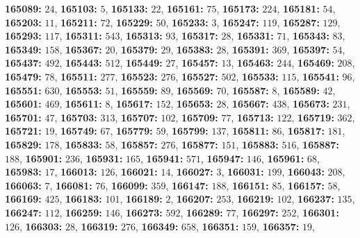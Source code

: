 \textsf{\bfseries 165089:} $24$, \textsf{\bfseries 165103:} $5$, \textsf{\bfseries 165133:} $22$, \textsf{\bfseries 165161:} $75$, \textsf{\bfseries 165173:} $224$, \textsf{\bfseries 165181:} $54$, \textsf{\bfseries 165203:} $11$, \textsf{\bfseries 165211:} $72$, \textsf{\bfseries 165229:} $50$, \textsf{\bfseries 165233:} $3$, \textsf{\bfseries 165247:} $119$, \textsf{\bfseries 165287:} $129$, \textsf{\bfseries 165293:} $117$, \textsf{\bfseries 165311:} $543$, \textsf{\bfseries 165313:} $93$, \textsf{\bfseries 165317:} $28$, \textsf{\bfseries 165331:} $71$, \textsf{\bfseries 165343:} $83$, \textsf{\bfseries 165349:} $158$, \textsf{\bfseries 165367:} $20$, \textsf{\bfseries 165379:} $29$, \textsf{\bfseries 165383:} $28$, \textsf{\bfseries 165391:} $369$, \textsf{\bfseries 165397:} $54$, \textsf{\bfseries 165437:} $492$, \textsf{\bfseries 165443:} $512$, \textsf{\bfseries 165449:} $27$, \textsf{\bfseries 165457:} $13$, \textsf{\bfseries 165463:} $244$, \textsf{\bfseries 165469:} $208$, \textsf{\bfseries 165479:} $78$, \textsf{\bfseries 165511:} $277$, \textsf{\bfseries 165523:} $276$, \textsf{\bfseries 165527:} $502$, \textsf{\bfseries 165533:} $115$, \textsf{\bfseries 165541:} $96$, \textsf{\bfseries 165551:} $630$, \textsf{\bfseries 165553:} $51$, \textsf{\bfseries 165559:} $89$, \textsf{\bfseries 165569:} $70$, \textsf{\bfseries 165587:} $8$, \textsf{\bfseries 165589:} $42$, \textsf{\bfseries 165601:} $469$, \textsf{\bfseries 165611:} $8$, \textsf{\bfseries 165617:} $152$, \textsf{\bfseries 165653:} $28$, \textsf{\bfseries 165667:} $438$, \textsf{\bfseries 165673:} $231$, \textsf{\bfseries 165701:} $47$, \textsf{\bfseries 165703:} $313$, \textsf{\bfseries 165707:} $102$, \textsf{\bfseries 165709:} $77$, \textsf{\bfseries 165713:} $122$, \textsf{\bfseries 165719:} $362$, \textsf{\bfseries 165721:} $19$, \textsf{\bfseries 165749:} $67$, \textsf{\bfseries 165779:} $59$, \textsf{\bfseries 165799:} $137$, \textsf{\bfseries 165811:} $86$, \textsf{\bfseries 165817:} $181$, \textsf{\bfseries 165829:} $178$, \textsf{\bfseries 165833:} $58$, \textsf{\bfseries 165857:} $276$, \textsf{\bfseries 165877:} $151$, \textsf{\bfseries 165883:} $516$, \textsf{\bfseries 165887:} $188$, \textsf{\bfseries 165901:} $236$, \textsf{\bfseries 165931:} $165$, \textsf{\bfseries 165941:} $571$, \textsf{\bfseries 165947:} $146$, \textsf{\bfseries 165961:} $68$, \textsf{\bfseries 165983:} $17$, \textsf{\bfseries 166013:} $126$, \textsf{\bfseries 166021:} $14$, \textsf{\bfseries 166027:} $3$, \textsf{\bfseries 166031:} $199$, \textsf{\bfseries 166043:} $208$, \textsf{\bfseries 166063:} $7$, \textsf{\bfseries 166081:} $76$, \textsf{\bfseries 166099:} $359$, \textsf{\bfseries 166147:} $188$, \textsf{\bfseries 166151:} $85$, \textsf{\bfseries 166157:} $58$, \textsf{\bfseries 166169:} $425$, \textsf{\bfseries 166183:} $101$, \textsf{\bfseries 166189:} $2$, \textsf{\bfseries 166207:} $253$, \textsf{\bfseries 166219:} $102$, \textsf{\bfseries 166237:} $135$, \textsf{\bfseries 166247:} $112$, \textsf{\bfseries 166259:} $146$, \textsf{\bfseries 166273:} $592$, \textsf{\bfseries 166289:} $77$, \textsf{\bfseries 166297:} $252$, \textsf{\bfseries 166301:} $126$, \textsf{\bfseries 166303:} $28$, \textsf{\bfseries 166319:} $276$, \textsf{\bfseries 166349:} $658$, \textsf{\bfseries 166351:} $159$, \textsf{\bfseries 166357:} $19$, 
